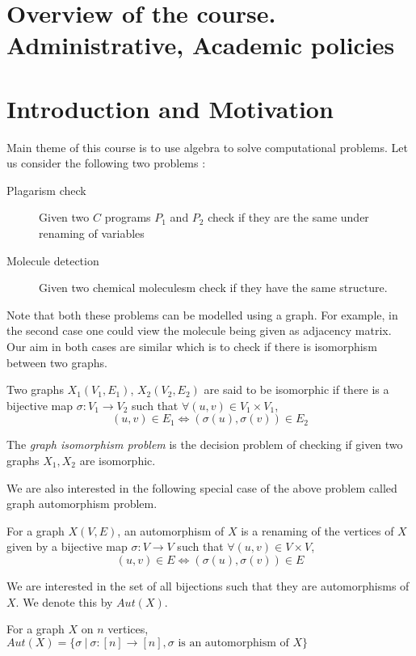 
\section{Overview of the course. Administrative, Academic policies}
\newpage

\section{Introduction and Motivation}
Main theme of this course is to use algebra to solve computational problems.
Let us consider the following two problems :
\begin{description}
	\item [Plagarism check]
	Given two $C$ programs $P_1$ and $P_2$ check if they are the same
	under renaming of variables
	\item [Molecule detection]
	Given two chemical moleculesm check if they have the same structure.
\end{description}

Note that both these problems can be modelled using a graph. For example, in
the second case one could view the molecule being given as adjacency matrix.
Our aim in both cases are similar which is to check if there is isomorphism
between two graphs.

\begin{definition}
	Two graphs $X_1(V_1,E_1)$, $X_2(V_2,E_2)$ are said to be isomorphic if
	there is a bijective map $\sigma:V_1 \to V_2$ such that $\forall
	(u,v) \in V_1 \times V_1$, \[(u,v) \in E_1 \iff (\sigma(u), \sigma(v))
	\in E_2 \]
\end{definition}
\begin{problem}
	The \emph{graph isomorphism problem} is the decision problem of
	checking if given two graphs $X_1, X_2$ are isomorphic.
\end{problem}

We are also interested in the following special case of the above problem
called graph automorphism problem. 

\begin{definition}
	For a graph $X(V,E)$, an automorphism of $X$ is a renaming of the
	vertices of $X$ given by a bijective map $\sigma:V \to V$ such 
	that $\forall
	(u,v) \in V \times V$, \[(u,v) \in E \iff (\sigma(u), \sigma(v))
	\in E \]
\end{definition}
We are interested in the set of all bijections such that they are
automorphisms of $X$. We denote this by $Aut(X)$.
\begin{definition}
	For a graph $X$ on $n$ vertices, 
	$Aut(X) = \{ \sigma ~|~ \sigma :[n] \to [n], \sigma \text{ is an
	automorphism of }X \}$
\end{definition}

